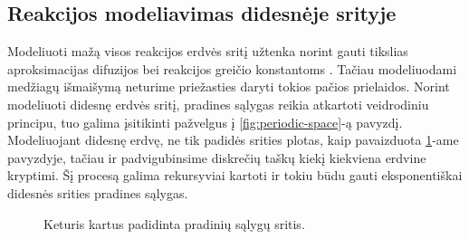 \newpage

\subsection{Reakcijos modeliavimas didesnėje srityje}

Modeliuoti mažą visos reakcijos erdvės sritį užtenka norint gauti tikslias aproksimacijas difuzijos bei reakcijos greičio konstantoms \cite{mackeviciusCloserLookComputer2012}. Tačiau modeliuodami medžiagų išmaišymą neturime priežasties daryti tokios pačios prielaidos. Norint modeliuoti didesnę erdvės sritį, pradines sąlygas reikia atkartoti veidrodiniu principu, tuo galima įsitikinti pažvelgus į \ref{fig:periodic-space}-ą pavyzdį. Modeliuojant didesnę erdvę, ne tik padidės srities plotas, kaip pavaizduota \ref{large-initial-conditions}-ame pavyzdyje, tačiau ir padvigubinsime diskrečių taškų kiekį kiekviena erdvine kryptimi. Šį procesą galima rekursyviai kartoti ir tokiu būdu gauti eksponentiškai didesnės srities pradines sąlygas.


\begin{figure}[h!]
\centering
{}
\caption{Keturis kartus padidinta pradinių sąlygų sritis. }

\label{large-initial-conditions}
\end{figure}

